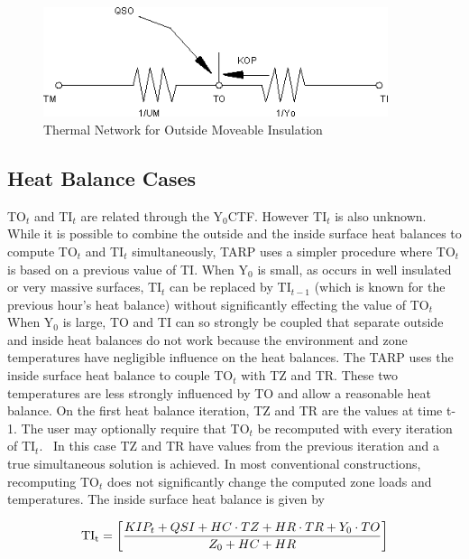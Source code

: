 \begin{figure}[hbtp] %
\centering
\includegraphics[width=0.9\textwidth, height=0.9\textheight, keepaspectratio=true]{media/image422.png}
\caption{  Thermal Network for Outside Moveable Insulation \protect \label{fig:thermal-network-for-outside-moveable}}
\end{figure}

\subsection{Heat Balance Cases}\label{heat-balance-cases}

TO\(_{t}\) and TI\(_{t}\) are related through the Y\(_{0}\)CTF. However TI\(_{t}\) is also unknown. While it is possible to combine the outside and the inside surface heat balances to compute TO\(_{t}\) and TI\(_{t}\) simultaneously, TARP uses a simpler procedure where TO\(_{t}\) is based on a previous value of TI. When Y\(_{0}\) is small, as occurs in well insulated or very massive surfaces, TI\(_{t}\) can be replaced by TI\(_{t-1}\) (which is known for the previous hour's heat balance) without significantly effecting the value of TO\(_{t}\) When Y\(_{0}\) is large, TO and TI can so strongly be coupled that separate outside and inside heat balances do not work because the environment and zone temperatures have negligible influence on the heat balances. The TARP uses the inside surface heat balance to couple TO\(_{t}\) with TZ and TR. These two temperatures are less strongly influenced by TO and allow a reasonable heat balance. On the first heat balance iteration, TZ and TR are the values at time t-1. The user may optionally require that TO\(_{t}\) be recomputed with every iteration of TI\(_{t}\). ~In this case TZ and TR have values from the previous iteration and a true simultaneous solution is achieved. In most conventional constructions, recomputing TO\(_{t}\) does not significantly change the computed zone loads and temperatures. The inside surface heat balance is given by

\begin{equation}
{\rm{T}}{{\rm{I}}_{\rm{t}}} = \left[ {\frac{{KI{P_t} + QSI + HC\cdot TZ + HR\cdot TR + {Y_0}\cdot TO}}{{{Z_0} + HC + HR}}} \right]
\end{equation}

